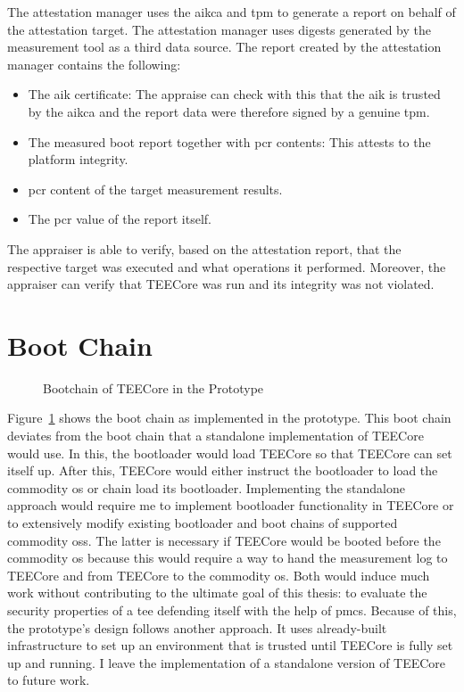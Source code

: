 The attestation manager uses the \gls{aikca} and \gls{tpm} to generate a report
on behalf of the attestation target. The attestation manager uses digests
generated by the measurement tool as a third data source. The report created by
the attestation manager contains the following:
\begin{itemize}
  \item The \gls{aik} certificate: The appraise can check with this that the
    \gls{aik} is trusted by the \gls{aikca} and the report data were
    therefore signed by a genuine \gls{tpm}.
  \item The measured boot report together with \gls{pcr} contents: This attests
    to the platform integrity.
  \item \gls{pcr} content of the target measurement results.
  \item The \gls{pcr} value of the report itself.
\end{itemize}

The appraiser is able to verify, based on the attestation report, that the
respective target was executed and what operations it performed. Moreover, the
appraiser can verify that TEECore was run and its integrity was not
violated.

\section{Boot Chain}
\label{sec:30:tee_boot_chain}
\begin{figure}
  \begin{center}
    
    \caption{Bootchain of TEECore in the Prototype}
    \label{fig:30:tee_bootchain}
  \end{center}
\end{figure}
Figure~\ref{fig:30:tee_bootchain} shows the boot chain as implemented in the
prototype. This boot chain deviates from the boot chain that a standalone
implementation of TEECore would use. In this, the bootloader would load TEECore
so that TEECore can set itself up. After this, TEECore would either instruct the
bootloader to load the commodity \gls{os} or chain load its bootloader.
Implementing the standalone approach would require me to implement bootloader
functionality in TEECore or to extensively modify existing bootloader and boot
chains of supported commodity \glspl{os}. The latter is necessary if TEECore
would be booted before the commodity \gls{os} because this would require a way
to hand the measurement log to TEECore and from TEECore to the commodity
\gls{os}. Both would induce much work without contributing to the ultimate goal
of this thesis: to evaluate the security properties of a \gls{tee} defending
itself with the help of \glspl{pmc}. Because of this, the prototype's design
follows another approach. It uses already-built infrastructure to set up an
environment that is trusted until TEECore is fully set up and running. I leave
the implementation of a standalone version of TEECore to future work.\\

